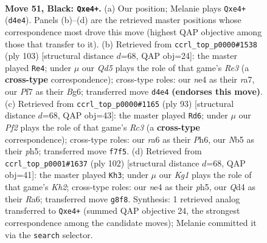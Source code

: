 \documentclass[11pt]{article}
\begin{document}
\clearpage

\begin{figure}[p]\centering
\begin{subfigure}{0.46\textwidth}\centering
\resizebox{\linewidth}{!}{%
\newchessgame
\chessboard[
  setfen={6k1/1r3pb1/R7/1n1P2R1/3qN3/8/4K1N1/8 b - - 2 51},
  showmover=false,
  pgfstyle=straightmove, color=movearrow, markmove={d4-e4}
]}
\caption{}
\end{subfigure}\hfill
\begin{subfigure}{0.46\textwidth}\centering
\resizebox{\linewidth}{!}{%
\newchessgame
\chessboard[
  setfen={8/R7/4r1bk/7p/8/4n2P/4R1P1/7K b - - 14 52},
  showmover=false,
  pgfstyle=straightmove, color=movearrow, markmove={e6-e4}
]}
\caption{}
\end{subfigure}
\\[4pt]
\begin{subfigure}{0.46\textwidth}\centering
\resizebox{\linewidth}{!}{%
\newchessgame
\chessboard[
  setfen={8/8/2r4p/7P/1R1bk3/5n2/PP6/3K1R2 b - - 14 47},
  showmover=false,
  pgfstyle=straightmove, color=movearrow, markmove={c6-d6}
]}
\caption{}
\end{subfigure}\hfill
\begin{subfigure}{0.46\textwidth}\centering
\resizebox{\linewidth}{!}{%
\newchessgame
\chessboard[
  setfen={8/7k/R3nb2/5N1p/8/6P1/4r1BK/8 w - - 8 52},
  showmover=false,
  pgfstyle=straightmove, color=movearrow, markmove={h2-h3}
]}
\caption{}
\end{subfigure}
\caption{\textbf{Move 51, Black: \texttt{Qxe4+}.} (a) Our position; Melanie plays \texttt{Qxe4+} (\texttt{d4e4}). Panels (b)--(d) are the retrieved master positions whose correspondence most drove this move (highest QAP objective among those that transfer to it). (b) Retrieved from \texttt{ccrl\_top\_p0000\#1538} (ply 103) [structural distance $d$=68, QAP obj=24]: the master played \texttt{Re4}; under $\mu$ our \emph{Qd5} plays the role of that game's \emph{Re3} (a \textbf{cross-type} correspondence); cross-type roles: our \emph{n}e4 as their \emph{r}a7, our \emph{P}f7 as their \emph{B}g6; transferred move \texttt{d4e4} \textbf{(endorses this move)}. (c) Retrieved from \texttt{ccrl\_top\_p0000\#1165} (ply 93) [structural distance $d$=68, QAP obj=43]: the master played \texttt{Rd6}; under $\mu$ our \emph{Pf2} plays the role of that game's \emph{Rc3} (a \textbf{cross-type} correspondence); cross-type roles: our \emph{r}a6 as their \emph{P}h6, our \emph{N}b5 as their \emph{p}h5; transferred move \texttt{f7f5}. (d) Retrieved from \texttt{ccrl\_top\_p0001\#1637} (ply 102) [structural distance $d$=68, QAP obj=41]: the master played \texttt{Kh3}; under $\mu$ our \emph{Kg1} plays the role of that game's \emph{Kh2}; cross-type roles: our \emph{n}e4 as their \emph{p}h5, our \emph{Q}d4 as their \emph{R}a6; transferred move \texttt{g8f8}. Synthesis: 1 retrieved analog transferred to \texttt{Qxe4+} (summed QAP objective 24, the strongest correspondence among the candidate moves); Melanie committed it via the \texttt{search} selector.}
\label{fig:thought-m101}
\end{figure}
\end{document}
